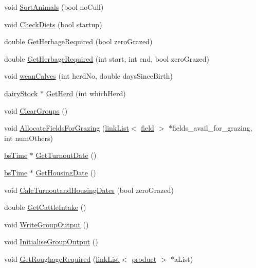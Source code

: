 \begin{DoxyCompactItemize}
\item 
void \hyperlink{classcattle_feeding_manager_aa1a64042c6fec08dd81b692c94a00349}{SortAnimals} (bool noCull)
\item 
void \hyperlink{classcattle_feeding_manager_a5d75b196c96519719f5580eadea8209e}{CheckDiets} (bool startup)
\item 
double \hyperlink{classcattle_feeding_manager_a2ba749a4e41bab1a7fac88fdc7783449}{GetHerbageRequired} (bool zeroGrazed)
\item 
double \hyperlink{classcattle_feeding_manager_a4d0a1389bc7cc6fa51824a521e2f83fe}{GetHerbageRequired} (int start, int end, bool zeroGrazed)
\item 
void \hyperlink{classcattle_feeding_manager_a02795723bb8cb2baab643f85962f2343}{weanCalves} (int herdNo, double daysSinceBirth)
\item 
\hyperlink{classdairy_stock}{dairyStock} $\ast$ \hyperlink{classcattle_feeding_manager_ab32e71fec849f4bb6598b18dcf24bcd4}{GetHerd} (int whichHerd)
\item 
void \hyperlink{classcattle_feeding_manager_a7981a5c91fd07f0286afa2f6cbcd7101}{ClearGroups} ()
\item 
void \hyperlink{classcattle_feeding_manager_ae70db6fbe1e89dbfd363f475f1536bb0}{AllocateFieldsForGrazing} (\hyperlink{classlink_list}{linkList}$<$ \hyperlink{classfield}{field} $>$ $\ast$fields\_\-avail\_\-for\_\-grazing, int numOthers)
\item 
\hyperlink{classbs_time}{bsTime} $\ast$ \hyperlink{classcattle_feeding_manager_a6fc27712d1be3fb9f192446d09f9e143}{GetTurnoutDate} ()
\item 
\hyperlink{classbs_time}{bsTime} $\ast$ \hyperlink{classcattle_feeding_manager_aae27bce98c713f0c2ee71f49d824f967}{GetHousingDate} ()
\item 
void \hyperlink{classcattle_feeding_manager_afb017b43e76fa6be2dcf1ee3419bf870}{CalcTurnoutandHousingDates} (bool zeroGrazed)
\item 
double \hyperlink{classcattle_feeding_manager_ae281377ceb953f7a91cf34992e36dbeb}{GetCattleIntake} ()
\item 
void \hyperlink{classcattle_feeding_manager_ade877ad01c1b7137db6b1bbfaf26ac5f}{WriteGroupOutput} ()
\item 
void \hyperlink{classcattle_feeding_manager_aa029e2a40c389801ab8fb6ecb4078c17}{InitialiseGroupOutput} ()
\item 
void \hyperlink{classcattle_feeding_manager_a67a9e9ba669dc913bd9f209a377c39c1}{GetRoughageRequired} (\hyperlink{classlink_list}{linkList}$<$ \hyperlink{classproduct}{product} $>$ $\ast$aList)

\end{DoxyCompactItemize}
